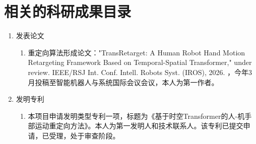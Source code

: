 \chapter{相关的科研成果目录}

\begin{enumerate}
	\item 发表论文
	\begin{enumerate}
		\item 重定向算法形成论文："TransRetarget: A Human Robot Hand Motion Retargeting Framework Based on Temporal-Spatial Transformer," under review. IEEE/RSJ Int. Conf. Intell. Robots Syst. (IROS), 2026. ，今年3月投稿至智能机器人与系统国际会议会议，本人为第一作者。
	\end{enumerate}
	\item 发明专利
	\begin{enumerate}
	\item 本项目申请发明类型专利一项，标题为《基于时空Transformer的人-机手部运动重定向方法》。本人为第一发明人和技术联系人。该专利已提交申请，已受理，处于审查阶段。
    \end{enumerate}
	
\end{enumerate}
